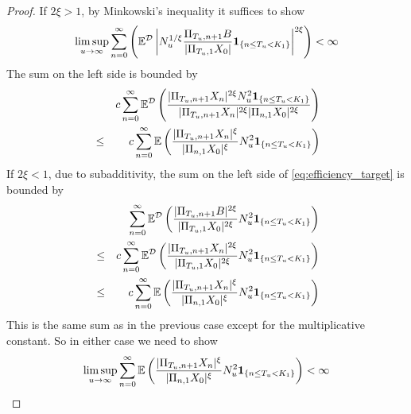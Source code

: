 \begin{proof}
  If $2 \xi > 1$, by Minkowski's inequality it suffices to show
  \begin{eqnarray*}
    \limsup_{u \to \infty}
    \sum_{n=0}^{\infty}
    \left(
      \mathbb{E}^{\mathcal D} \left|
        N_u^{1/\xi}
        \frac{
          \Pi_{T_u, n+1} B 
        }{
          |\Pi_{T_u, 1} X_0|
        }
        \mathbf{1}_{\{n \leq T_u < K_1\}}
      \right|^{2 \xi}
    \right)
    < \infty
  \end{eqnarray*}
  The sum on the left side is bounded by
  \begin{eqnarray*}
    && c \sum_{n=0}^\infty
    \mathbb{E}^{\mathcal D}
    \left(
      {
        |\Pi_{T_u, n+1} X_n|^{2\xi}
        N_u^2
        \mathbf{1}_{\{n \leq T_u < K_1\}}
        \over
        |\Pi_{T_u, n+1} X_n|^{2\xi}
        |\Pi_{n,1} X_0|^{2\xi}
      }
    \right)\\
    &\leq&
    c \sum_{n=0}^\infty
    \mathbb{E}
    \left(
      {
        |\Pi_{T_u, n+1} X_n|^\xi
        \over
        |\Pi_{n,1} X_0|^{\xi}
      }
      N_u^2
      \mathbf{1}_{\{n \leq T_u < K_1\}}
    \right)
  \end{eqnarray*}
  If $2\xi < 1$, due to subadditivity, the sum on the left side of
  \eqref{eq:efficiency_target} is bounded by
  \begin{eqnarray*}
    && \sum_{n=0}^\infty
    \mathbb{E}^{\mathcal D} \left(
      {
        | \Pi_{T_u, n+1} B |^{2\xi}
        \over
        | \Pi_{T_u, 1} X_0 |^{2\xi}
      }
      N_u^2
      \mathbf{1}_{\{n \leq T_u < K_1\}}
    \right) \\
    &\leq&
    c \sum_{n=0}^\infty
    \mathbb{E}^{\mathcal D} \left(
      {
        | \Pi_{T_u, n+1} X_n |^{2\xi}
        \over
        | \Pi_{T_u, 1} X_0 |^{2\xi}
      }
      N_u^2
      \mathbf{1}_{\{n \leq T_u < K_1\}}
    \right) \\
    &\leq&
    c \sum_{n=0}^\infty
    \mathbb{E} \left(
      {
        | \Pi_{T_u, n+1} X_n |^{\xi}
        \over
        | \Pi_{n,1} X_0 |^{\xi}
      }
      N_u^2
      \mathbf{1}_{\{n \leq T_u < K_1\}}
    \right)
  \end{eqnarray*}
  This is the same sum as in the previous case except for the
  multiplicative constant. So in either case we need to show
  \begin{equation}
    \label{eq:rhjd}
    \limsup_{u \to \infty}
    \sum_{n=0}^\infty
    \mathbb{E} \left(
      {
        | \Pi_{T_u, n+1} X_n |^{\xi}
        \over
        | \Pi_{n,1} X_0 |^{\xi}
      }
      N_u^2
      \mathbf{1}_{\{n \leq T_u < K_1\}}
    \right) < \infty
  \end{equation}
  

\end{proof}
